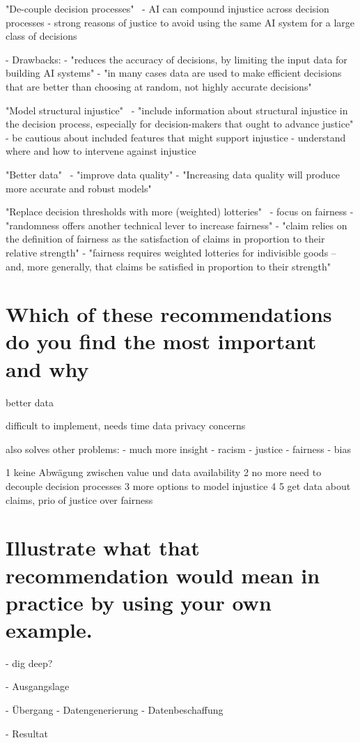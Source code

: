 "De-couple decision processes"~\parencite[][22]{vredenburgh}
- AI can compound injustice across decision processes
- strong reasons of justice to avoid using the same AI system for a large class of decisions

- Drawbacks:
  - "reduces the accuracy of decisions, by limiting the input data for building AI systems"
  - "in many cases data are used to make efficient decisions that are better than choosing at random, not highly accurate decisions"

"Model structural injustice"~\parencite[][23]{vredenburgh}
- "include information about structural injustice in the decision process, especially for decision-makers that ought to advance justice"
- be cautious about included features that might support injustice
- understand where and how to intervene against injustice

"Better data"~\parencite[][24]{vredenburgh}
- "improve data quality"
- "Increasing data quality will produce more accurate and robust models"

"Replace decision thresholds with more (weighted) lotteries"~\parencite[][24]{vredenburgh}
- focus on fairness
- "randomness offers another technical lever to increase fairness"
- "claim relies on the definition of fairness as the satisfaction of claims in proportion to their relative strength"
- "fairness requires weighted lotteries for indivisible goods – and, more generally, that claims be satisfied in proportion to their strength"


\section*{Which of these recommendations do you find the most important and why}

better data


difficult to implement, needs time
data privacy concerns


also solves other problems:
- much more insight
  - racism
  - justice
  - fairness
  - bias


1 keine Abwägung zwischen value und data availability
2 no more need to decouple decision processes
3 more options to model injustice
4
5 get data about claims, prio of justice over fairness




\section*{Illustrate what that recommendation would mean in practice by using your own example.}

- dig deep?

- Ausgangslage

- Übergang
  - Datengenerierung
  - Datenbeschaffung

- Resultat

